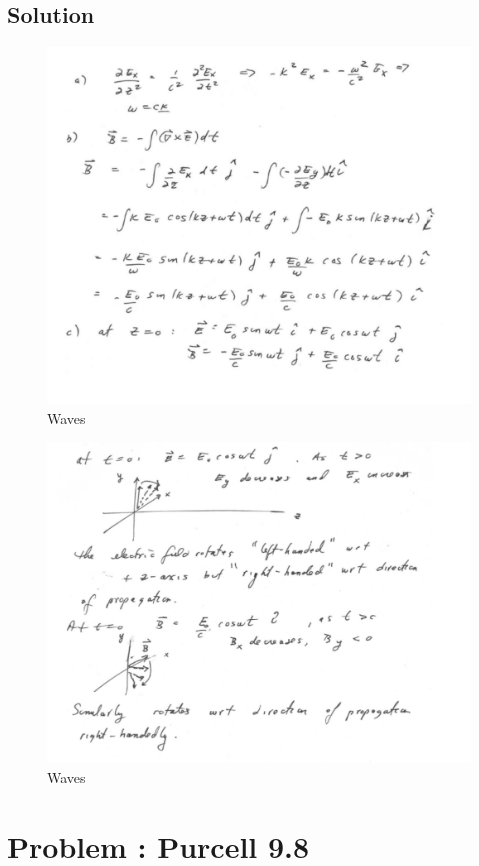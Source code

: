 \documentclass[solutions]{esg8022pset}
\begin{document}
\subsection{Solution}
\begin{figure}[H]
    \centering
    \includegraphics[width = 15cm]{waves2sola}
   \caption{Waves}
  \end{figure}
  \begin{figure}[H]
    \centering
    \includegraphics[width = 15cm]{waves2solb}
   \caption{Waves}
  \end{figure}
\section{Problem \thesection: Purcell 9.8}
\end{document}
